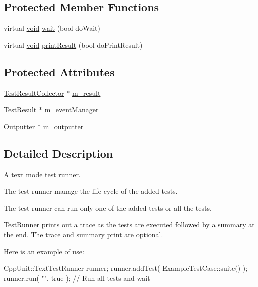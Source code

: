 \subsection*{Protected Member Functions}
\begin{DoxyCompactItemize}
\item 
virtual \hyperlink{wglew_8h_aeea6e3dfae3acf232096f57d2d57f084}{void} \hyperlink{class_text_test_runner_a5b192f9419f5d1e6ebe9abd4755da140}{wait} (bool do\-Wait)
\item 
virtual \hyperlink{wglew_8h_aeea6e3dfae3acf232096f57d2d57f084}{void} \hyperlink{class_text_test_runner_aa01e5dee4cdad860ee7154329918f9ac}{print\-Result} (bool do\-Print\-Result)
\end{DoxyCompactItemize}
\subsection*{Protected Attributes}
\begin{DoxyCompactItemize}
\item 
\hyperlink{class_test_result_collector}{Test\-Result\-Collector} $\ast$ \hyperlink{class_text_test_runner_a61cf52af4ee1c64e0e8d07fe86b91ea7}{m\-\_\-result}
\item 
\hyperlink{class_test_result}{Test\-Result} $\ast$ \hyperlink{class_text_test_runner_acfe13b2f69c0113670e3ba72704c0cf5}{m\-\_\-event\-Manager}
\item 
\hyperlink{class_outputter}{Outputter} $\ast$ \hyperlink{class_text_test_runner_a01e4b671a1e8a32781ef6bcb91e4e95e}{m\-\_\-outputter}
\end{DoxyCompactItemize}


\subsection{Detailed Description}
A text mode test runner.

The test runner manage the life cycle of the added tests. 

The test runner can run only one of the added tests or all the tests.

\hyperlink{class_test_runner}{Test\-Runner} prints out a trace as the tests are executed followed by a summary at the end. The trace and summary print are optional.

Here is an example of use\-:


\begin{DoxyCode}
CppUnit::TextTestRunner runner;
runner.addTest( ExampleTestCase::suite() );
runner.run( \textcolor{stringliteral}{""}, \textcolor{keyword}{true} );    \textcolor{comment}{// Run all tests and wait}
\end{DoxyCode}


